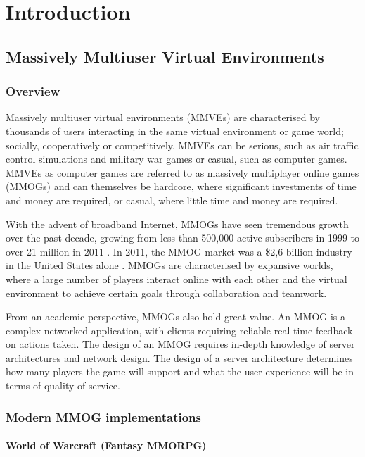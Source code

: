 \chapter{Introduction}
\label{chp:INTRO}

\section{Massively Multiuser Virtual Environments}

\subsection{Overview}

Massively multiuser virtual environments (MMVEs) are characterised by thousands of users interacting in the same virtual environment or game world; socially, cooperatively or competitively. MMVEs can be serious, such as air traffic control simulations and military war games or casual, such as computer games. MMVEs as computer games are referred to as massively multiplayer online games (MMOGs) and can themselves be hardcore, where significant investments of time and money are required, or casual, where little time and money are required.

With the advent of broadband Internet, MMOGs have seen tremendous growth over the past decade, growing from less than 500,000 active subscribers in 1999 to over 21 million in 2011 \cite{mmo_growth_chart}. In 2011, the MMOG market was a \$2,6 billion industry in the United States alone \cite{newzoo_mmo_report}. MMOGs are characterised by expansive worlds, where a large number of players interact online with each other and the virtual environment to achieve certain goals through collaboration and teamwork.

From an academic perspective, MMOGs also hold great value. An MMOG is a complex networked application, with clients requiring reliable real-time feedback on actions taken. The design of an MMOG requires in-depth knowledge of server architectures and network design. The design of a server architecture determines how many players the game will support and what the user experience will be in terms of quality of service.

\subsection{Modern MMOG implementations}
\label{modern_mmogs}

\subsubsection{World of Warcraft (Fantasy MMORPG)}

